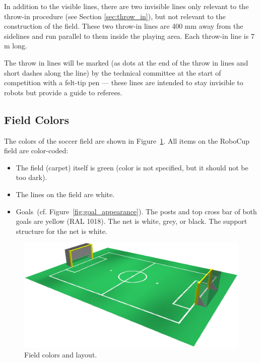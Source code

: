 \documentclass[12pt]{article}
\newcommand{\cf}{\mbox{cf.}\xspace}
\begin{document}
In addition to the visible lines, there are two invisible lines only relevant to the throw-in procedure (see Section \ref{sec:throw_in}), but not relevant to the construction of the field. These two throw-in lines are 400 mm away from the sidelines and run parallel to them inside the playing area.  Each throw-in line is 7 m long.

The throw in lines will be marked (as dots at the end of the throw in lines and short dashes along the line) by the technical committee at the start of competition with a felt-tip pen --- these lines are intended to stay invisible to robots but provide a guide to referees.

\subsection{Field Colors}

The colors of the soccer field are shown in Figure~\ref{fig:field_color}. All items on the RoboCup field are color-coded:

\begin{itemize}

\item The field (carpet) itself is green (color is not specified, but it should not be too dark).

\item The lines on the field are white.

\item Goals~(\cf Figure~\ref{fig:goal_appearance}). The posts and top cross bar of both goals are yellow (RAL 1018). The net is white, grey, or black.  The support structure for the net is white.

\end{itemize}

\begin{figure}[t]
\centerline{\includegraphics[width=\columnwidth]{figs/emptyfield_2012.png}}
\caption{Field colors and layout.}
\label{fig:field_color}
\end{figure}
\end{document}
